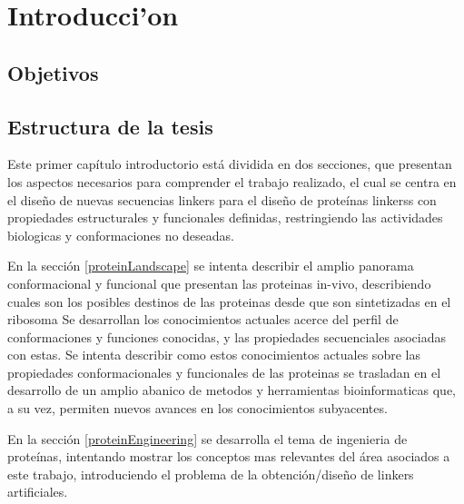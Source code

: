\chapter{Introducci'on}
% 

\section{Objetivos}


\section{Estructura de la tesis}

Este primer capítulo introductorio está dividida en dos secciones, que presentan los aspectos necesarios para comprender el trabajo realizado, el cual se centra en el diseño de nuevas secuencias linkers para el diseño de proteínas linkerss con 
propiedades estructurales y funcionales definidas, restringiendo las actividades biologicas y conformaciones no deseadas.
 
En la sección \ref{proteinLandscape} se intenta describir el amplio panorama conformacional y funcional que presentan las proteinas in-vivo, describiendo cuales son los posibles destinos de las proteinas desde que son sintetizadas en el ribosoma
Se desarrollan los conocimientos actuales acerce del perfil de conformaciones y funciones conocidas, y las propiedades secuenciales asociadas con estas.
Se intenta describir como estos conocimientos actuales sobre las propiedades conformacionales y funcionales de las proteinas se trasladan en el desarrollo 
de un amplio abanico de metodos y herramientas bioinformaticas que, a su vez, permiten nuevos avances en los conocimientos subyacentes.

En la sección \ref{proteinEngineering} se desarrolla el tema de ingenieria de proteínas, intentando mostrar los conceptos mas relevantes del área asociados a este trabajo, introduciendo el problema de la obtención/diseño de linkers artificiales.

